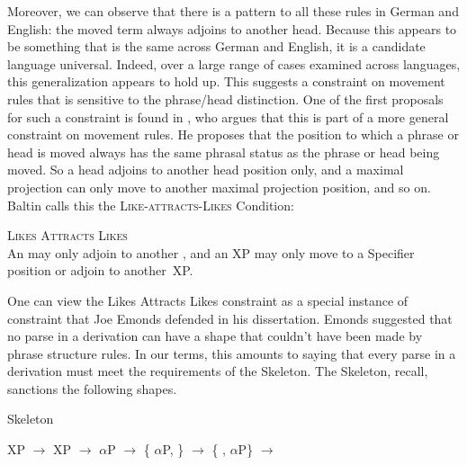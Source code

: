 Moreover, we can observe that there is a pattern to all these rules in German and English: the moved term always adjoins to another head. Because this appears to be something that is the same across German and English, it is a candidate language universal. Indeed, over a large range of cases examined across languages, this generalization appears to hold up. This suggests a constraint on movement rules that is sensitive to the phrase/head distinction. One of the first proposals for such a constraint is found in \citet{Baltin:1982}, who argues that this is part of a more general constraint on movement rules. He proposes that the position to which a phrase or head is moved always has the same phrasal status as the phrase or head being moved. So a head adjoins to another head position only, and a maximal projection can only move to another maximal projection position, and so on. Baltin calls this the \textsc{Like-attracts-Likes} Condition:
\begin{exe}
	\ex \label{ex4:28} \textsc{Likes Attracts Likes}\\ 
		An  may only adjoin to another , and an XP may only move to a Specifier position or adjoin to another~XP.\\
		\hfill \citep[roughly (1), p.~2]{Baltin:1982}\hfill\hspace*{.15in}
\end{exe}
One can view the Likes Attracts Likes constraint as a special instance of constraint that Joe Emonds\cite{Emonds:1970} defended in his dissertation. Emonds suggested that no parse in a derivation can have a shape that couldn't have been made by phrase structure rules. %
%
%
%
In our terms, this amounts to saying that every parse in a derivation must meet the requirements of the  Skeleton. The  Skeleton, recall, sanctions the following shapes.
\begin{exe}
\raggedright
	\ex \label{ex3:skel1}  Skeleton
	\begin{xlist}
		\ex XP $\rightarrow$ 
		\ex XP $\rightarrow$ $\alpha$P 
		\ex {} $\rightarrow$ \{ $\alpha$P, \}
		\ex {} $\rightarrow$ \{ , $\alpha$P\}
		\ex {} $\rightarrow$ 
	\end{xlist}
\end{exe}
